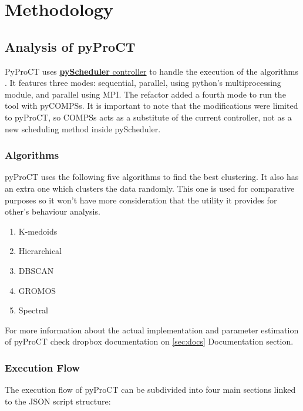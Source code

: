 \chapter{Methodology}
\label{chap:method}

\section{Analysis of pyProCT}
\label{sec:sdd}

PyProCT uses \hyperref[sec:docs]{\textbf{pyScheduler} controller} to handle the execution of the algorithms . It features three modes: sequential, parallel, using python's multiprocessing module, and parallel using MPI. The refactor added a fourth mode to run the tool with pyCOMPSs. It is important to note that the modifications were limited to pyProCT, so COMPSs acts as a substitute of the current controller, not as a new scheduling method inside pyScheduler.


\subsection {Algorithms}

pyProCT uses the following five algorithms to find the best clustering. It also has an extra one which clusters the data randomly. This one is used for comparative purposes so it won't have more consideration that the utility it provides for other's behaviour analysis.

\begin{enumerate}

\item{K-medoids}
\item{Hierarchical}
\item{DBSCAN}
\item{GROMOS}
\item{Spectral}

\end{enumerate}

For more information about the actual implementation and parameter estimation of pyProCT check dropbox documentation on \ref{sec:docs} Documentation section.

\subsection{Execution Flow}
\label{sec:execution_flow}

The execution flow of pyProCT can be subdivided into four main sections linked to the JSON script structure:

